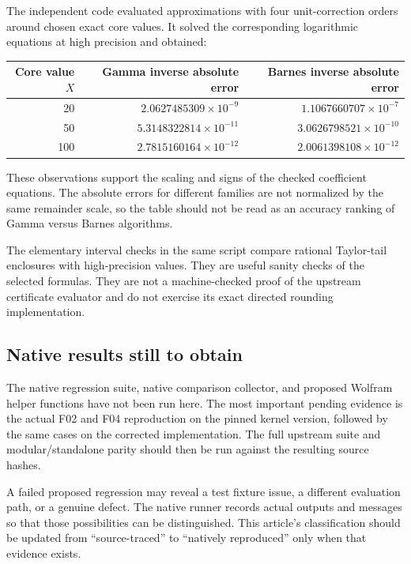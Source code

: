 \documentclass[11pt,a4paper]{article}
\theoremstyle{definition}
\begin{document}
The independent code evaluated approximations with four unit-correction orders around chosen exact core values. It solved the corresponding logarithmic equations at high precision and obtained:
\begin{center}
\begin{tabular}{@{}rrr@{}}
\toprule
Core value $X$ & Gamma inverse absolute error & Barnes inverse absolute error\\
\midrule
20 & $2.0627485309\times10^{-9}$ & $1.1067660707\times10^{-7}$\\
50 & $5.3148322814\times10^{-11}$ & $3.0626798521\times10^{-10}$\\
100 & $2.7815160164\times10^{-12}$ & $2.0061398108\times10^{-12}$\\
\bottomrule
\end{tabular}
\end{center}
These observations support the scaling and signs of the checked coefficient equations. The absolute errors for different families are not normalized by the same remainder scale, so the table should not be read as an accuracy ranking of Gamma versus Barnes algorithms.

The elementary interval checks in the same script compare rational Taylor-tail enclosures with high-precision values. They are useful sanity checks of the selected formulas. They are not a machine-checked proof of the upstream certificate evaluator and do not exercise its exact directed rounding implementation.

\subsection{Native results still to obtain}

The native regression suite, native comparison collector, and proposed Wolfram helper functions have not been run here. The most important pending evidence is the actual F02 and F04 reproduction on the pinned kernel version, followed by the same cases on the corrected implementation. The full upstream suite and modular/standalone parity should then be run against the resulting source hashes.

A failed proposed regression may reveal a test fixture issue, a different evaluation path, or a genuine defect. The native runner records actual outputs and messages so that those possibilities can be distinguished. This article's classification should be updated from ``source-traced'' to ``natively reproduced'' only when that evidence exists.
\end{document}
